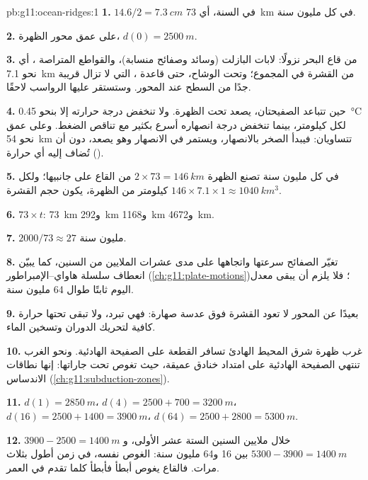 \begin{solution}{pb:g11:ocean-ridges:1}
\textbf{1.} $14.6/2 = \qty{7.3}{cm}$ في السنة، أي \qty{73}{km} في كل مليون
سنة.

\textbf{2.} على عمق محور الظهرة، $d(0) = \qty{2500}{m}$.

\textbf{3.} من قاع البحر نزولًا: لابات البازلت (وسائد وصفائح منسابة)،
والقواطع المتراصة ، أي نحو \qty{7.1}{km} من القشرة في المجموع؛ وتحت
  الوشاح، حتى قاعدة ، التي لا تزال
قريبة جدًا من السطح عند المحور. وستستقر عليها الرواسب لاحقًا.

\textbf{4.} حين تتباعد الصفيحتان، يصعد  تحت
الظهرة. ولا تنخفض درجة حرارته إلا بنحو \qty{0.45}{\celsius} لكل
كيلومتر، بينما تنخفض درجة انصهاره أسرع بكثير مع تناقص
الضغط. وعلى عمق نحو \qty{54}{km} تتساويان: فيبدأ الصخر بالانصهار،
ويستمر في الانصهار وهو يصعد، دون أن تُضاف إليه أي حرارة ().

\textbf{5.} في كل مليون سنة تصنع الظهرة $2 \times 73 = \qty{146}{km}$
من القاع على جانبيها؛ ولكل كيلومتر من الظهرة، يكون حجم القشرة
$146 \times 7.1 \times 1 \approx \qty{1040}{km^3}$.

\textbf{6.} $73 \times t$: \qty{73}{km} و\qty{292}{km} و\qty{1168}{km}
و\qty{4672}{km}.

\textbf{7.} $2000/73 \approx 27$ مليون سنة.

\textbf{8.} تغيّر الصفائح سرعتها واتجاهها على مدى عشرات الملايين من
السنين، كما يبيّن انعطاف سلسلة هاواي--الإمبراطور
(\cref{ch:g11:plate-motions})؛ فلا يلزم أن يبقى معدل اليوم ثابتًا طوال 64
مليون سنة.

\textbf{9.} بعيدًا عن المحور لا تعود القشرة فوق عدسة صهارة: فهي
تبرد، ولا تبقى تحتها حرارة كافية لتحريك الدوران وتسخين الماء.

\textbf{10.} غرب ظهرة شرق المحيط الهادئ تسافر القطعة على الصفيحة
الهادئية. ونحو الغرب تنتهي الصفيحة الهادئية على امتداد خنادق عميقة، حيث
تغوص تحت جاراتها: إنها نطاقات الاندساس (\cref{ch:g11:subduction-zones}).

\textbf{11.} $d(1) = \qty{2850}{m}$، $d(4) = 2500 + 700 = \qty{3200}{m}$،
$d(16) = 2500 + 1400 = \qty{3900}{m}$، $d(64) = 2500 + 2800 = \qty{5300}{m}$.

\textbf{12.} $3900 - 2500 = \qty{1400}{m}$ خلال ملايين السنين الستة عشر الأولى،
و$5300 - 3900 = \qty{1400}{m}$ بين 16 و64 مليون سنة: الغوص
نفسه، في زمن أطول بثلاث مرات. فالقاع يغوص أبطأ فأبطأ
كلما تقدم في العمر.


\end{solution}
